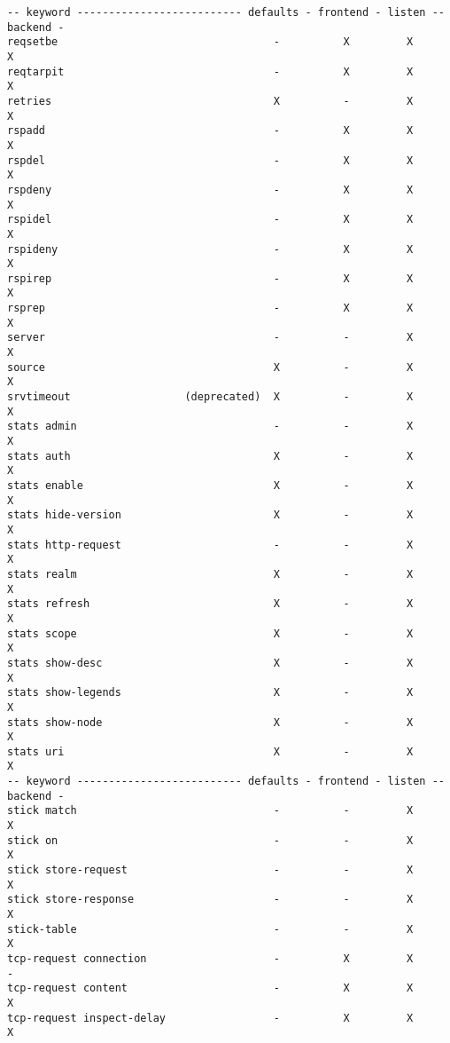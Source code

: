 \begin{verbatim}
-- keyword -------------------------- defaults - frontend - listen -- backend -
reqsetbe                                  -          X         X         X
reqtarpit                                 -          X         X         X
retries                                   X          -         X         X
rspadd                                    -          X         X         X
rspdel                                    -          X         X         X
rspdeny                                   -          X         X         X
rspidel                                   -          X         X         X
rspideny                                  -          X         X         X
rspirep                                   -          X         X         X
rsprep                                    -          X         X         X
server                                    -          -         X         X
source                                    X          -         X         X
srvtimeout                  (deprecated)  X          -         X         X
stats admin                               -          -         X         X
stats auth                                X          -         X         X
stats enable                              X          -         X         X
stats hide-version                        X          -         X         X
stats http-request                        -          -         X         X
stats realm                               X          -         X         X
stats refresh                             X          -         X         X
stats scope                               X          -         X         X
stats show-desc                           X          -         X         X
stats show-legends                        X          -         X         X
stats show-node                           X          -         X         X
stats uri                                 X          -         X         X
-- keyword -------------------------- defaults - frontend - listen -- backend -
stick match                               -          -         X         X
stick on                                  -          -         X         X
stick store-request                       -          -         X         X
stick store-response                      -          -         X         X
stick-table                               -          -         X         X
tcp-request connection                    -          X         X         -
tcp-request content                       -          X         X         X
tcp-request inspect-delay                 -          X         X         X

\end{verbatim}

